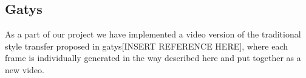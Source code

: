 \subsection{Gatys}

As a part of our project we have implemented a video version of the traditional style transfer proposed in gatys[INSERT REFERENCE HERE], where each frame is individually generated in the way described here and put together as a new video. 
